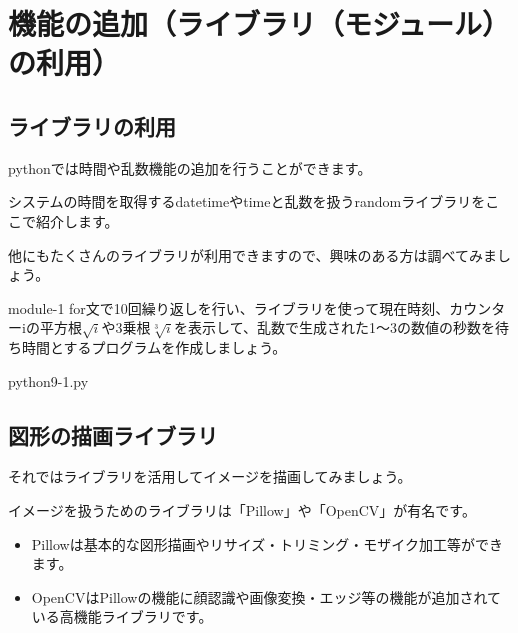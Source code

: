 \documentclass[11pt,a4paper,dvipdfmx,titlepage]{jsreport}
\begin{document}
\section{機能の追加（ライブラリ（モジュール）の利用）}
\subsection{ライブラリの利用}
pythonでは時間や乱数機能の追加を行うことができます。

システムの時間を取得するdatetimeやtimeと乱数を扱うrandomライブラリをここで紹介します。

他にもたくさんのライブラリが利用できますので、興味のある方は調べてみましょう。
\begin{pabox}{module-1}
for文で10回繰り返しを行い、ライブラリを使って現在時刻、カウンターiの平方根$\sqrt{　i　}$や3乗根$\sqrt[3]{　i　}$を表示して、乱数で生成された1～3の数値の秒数を待ち時間とするプログラムを作成しましょう。


\begin{codebox}{python9-1.py}
\end{codebox}
\end{pabox}

\subsection{図形の描画ライブラリ}
それではライブラリを活用してイメージを描画してみましょう。

イメージを扱うためのライブラリは「Pillow」や「OpenCV」が有名です。

\begin{itemize}
\item Pillowは基本的な図形描画やリサイズ・トリミング・モザイク加工等ができます。
\item OpenCVはPillowの機能に顔認識や画像変換・エッジ等の機能が追加されている高機能ライブラリです。
\end{itemize}
\end{document}
